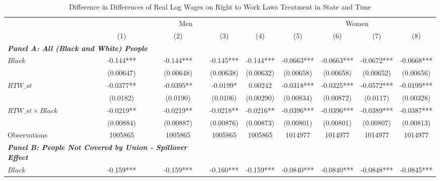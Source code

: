 \begin{table}[ht!]\centering
\def\sym#1{\ifmmode^{#1}\else\(^{#1}\)\fi}
\caption{Difference in Differences of Real Log Wages on Right to Work Laws Treatment in State and Time}\label{tab:wagstagdid}
\begin{tabular}{l*{8}{c}}
\hline
&\multicolumn{4}{c}{Men}                                        &\multicolumn{4}{c}{Women}                                      \\\cmidrule(lr){2-5}\cmidrule(lr){6-9}
&\multicolumn{1}{c}{(1)}   &\multicolumn{1}{c}{(2)}   &\multicolumn{1}{c}{(3)}   &\multicolumn{1}{c}{(4)}   &\multicolumn{1}{c}{(5)}   &\multicolumn{1}{c}{(6)}   &\multicolumn{1}{c}{(7)}   &\multicolumn{1}{c}{(8)}   \\
\hline
\multicolumn{3}{l}{\linebreak \textbf{\textit{Panel A: All (Black and White) People}}} \\
$ Black $           &      -0.144***&      -0.144***&      -0.145***&      -0.144***&     -0.0663***&     -0.0663***&     -0.0672***&     -0.0668***\\
&   (0.00647)   &   (0.00648)   &   (0.00638)   &   (0.00632)   &   (0.00658)   &   (0.00658)   &   (0.00652)   &   (0.00656)   \\
[1em]
$ RTW\_{st} $      &     -0.0377** &     -0.0395** &     -0.0199*  &     0.00242   &     -0.0318***&     -0.0325***&     -0.0572***&     -0.0199***\\
&    (0.0182)   &    (0.0190)   &    (0.0106)   &   (0.00290)   &   (0.00834)   &   (0.00872)   &    (0.0117)   &   (0.00328)   \\
[1em]
$ RTW\_{st} \times Black $&     -0.0219** &     -0.0219** &     -0.0218** &     -0.0216** &     -0.0396***&     -0.0396***&     -0.0389***&     -0.0387***\\
&   (0.00884)   &   (0.00887)   &   (0.00876)   &   (0.00873)   &   (0.00801)   &   (0.00801)   &   (0.00807)   &   (0.00813)   \\
\hline
Observations        &     1005865   &     1005865   &     1005865   &     1005865   &     1014977   &     1014977   &     1014977   &     1014977   \\
\hline
\multicolumn{3}{l}{\linebreak \textbf{\textit{Panel B: People Not Covered by Union - Spillover Effect}}} \\
$ Black $           &      -0.159***&      -0.159***&      -0.160***&      -0.159***&     -0.0840***&     -0.0840***&     -0.0848***&     -0.0845***\\

\end{tabular}
\end{table}
